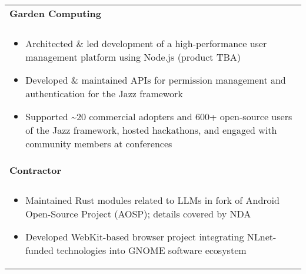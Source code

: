 \documentclass[letterpaper,10pt]{article} %
\begin{document}
\begin{tabular*}{\linewidth}{@{\extracolsep{\fill}} lr }
\textbf{Garden Computing} & \scriptsize\bfseries\color{sectioncolour}{San Francisco, CA}\\
\footnotesize\bfseries\color{sectioncolour}{Full-Stack Software Engineer} & \scriptsize\bfseries\color{sectioncolour}{February 2025 - July 2025}\\
\multicolumn{2}{p{\linewidth}}{
    \scriptsize{\vspace{-0.1in}\begin{itemize}[nosep]
        \item Architected \& led development of a high-performance user management platform using Node.js (product TBA)
        \item Developed \& maintained APIs for permission management and authentication for the Jazz framework
        \item Supported \~{}20 commercial adopters and 600+ open-source users of the Jazz framework, hosted hackathons, and engaged with community members at conferences
    \end{itemize}\vspace{-0.00in}}
}\\

\textbf{Contractor} & \scriptsize\bfseries\color{sectioncolour}{Remote}\\
\footnotesize\bfseries\color{sectioncolour}{Full-Stack Software Engineer} & \scriptsize\bfseries\color{sectioncolour}{August 2024 - February 2025}\\
\multicolumn{2}{p{\linewidth}}{
    \scriptsize{\vspace{-0.1in}\begin{itemize}[nosep]
        \item Maintained Rust modules related to LLMs in fork of Android Open-Source Project (AOSP); details covered by NDA
        \item Developed WebKit-based browser project integrating NLnet-funded technologies into GNOME software ecosystem
    \end{itemize}\vspace{-0.00in}}
}\\


\end{tabular*}
\end{document}

